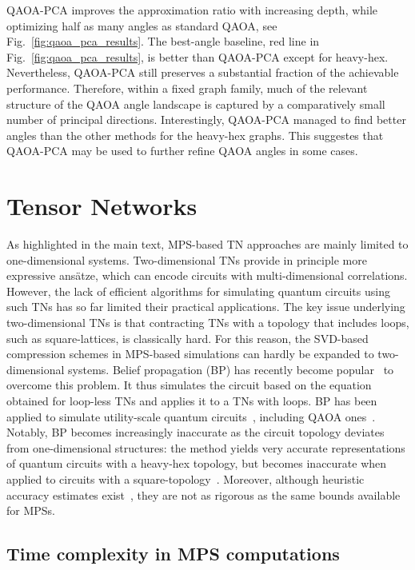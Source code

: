 \documentclass[twocolumn,
english,
aps,
pra,
10pt,
longbibliography,
superscriptaddress,
amsmath,
amssymb,
floatfix
]{revtex4-2}
\begin{document}
{QAOA-PCA improves the approximation ratio with increasing depth, while optimizing half as many angles as standard QAOA, see Fig.~\ref{fig:qaoa_pca_results}. 
The best-angle baseline, red line in Fig.~\ref{fig:qaoa_pca_results}, is better than QAOA-PCA except for heavy-hex.
Nevertheless, QAOA-PCA still preserves a substantial fraction of the achievable performance.
Therefore, within a fixed graph family, much of the relevant structure of the QAOA angle landscape is captured by a comparatively small number of principal directions.
Interestingly, QAOA-PCA managed to find better angles than the other methods for the heavy-hex graphs.
This suggestes that QAOA-PCA may be used to further refine QAOA angles in some cases.


\section{Tensor Networks\label{app:tn}}

As highlighted in the main text, MPS-based TN approaches are mainly limited to one-dimensional systems.
Two-dimensional TNs provide in principle more expressive ans\"atze, which can encode circuits with multi-dimensional correlations.
However, the lack of efficient algorithms for simulating quantum circuits using such TNs has so far limited their practical applications.
The key issue underlying two-dimensional TNs is that contracting TNs with a topology that includes loops, such as square-lattices, is classically hard.
For this reason, the SVD-based compression schemes in MPS-based simulations can hardly be expanded to two-dimensional systems.
Belief propagation (BP) has recently become popular~\cite{Tindall2023_BP-TN} to overcome this problem.
It thus simulates the circuit based on the equation obtained for loop-less TNs and applies it to a TNs with loops.
BP has been applied to simulate utility-scale quantum circuits~\cite{Rudolph2025_BP-QuantumCircuit}, including QAOA ones~\cite{Luchnikov2024_BP-Annealing}.
Notably, BP becomes increasingly inaccurate as the circuit topology deviates from one‑dimensional structures: the method yields very accurate representations of quantum circuits with a heavy-hex topology, but becomes inaccurate when applied to circuits with a square-topology~\cite{Rudolph2025_BP-QuantumCircuit}.
Moreover, although heuristic accuracy estimates exist~\cite{Rudolph2025_BP-QuantumCircuit}, they are not as rigorous as the same bounds available for MPSs.

\subsection{Time complexity in MPS computations}

}
\end{document}
